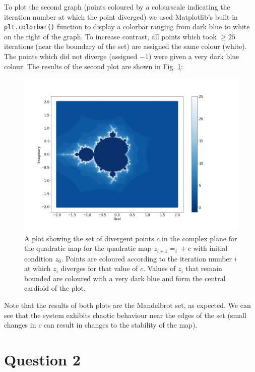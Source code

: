 \documentclass{article}
\begin{document}
To plot the second graph (points coloured by a colourscale indicating the iteration number at which the point diverged) we used Matplotlib's built-in \texttt{plt.colorbar()} function to display a colorbar ranging from dark blue to white on the right of the graph. To increase contrast, all points which took $\geq 25$ iterations (near the boundary of the set) are assigned the same colour (white). The points which did not diverge (assigned $-1$) were given a very dark blue colour. The results of the second plot are shown in Fig. \ref{fig:quad_map_scale}:
\begin{figure}
    \hspace{-15mm}
    \includegraphics[scale=0.6]{quad_map_colouring_scale.png}
    \caption{A plot showing the set of divergent points $c$ in the complex plane for the quadratic map for the quadratic map $z_{i + 1} = _i + c$ with initial condition $z_0$. Points are coloured according to the iteration number $i$ at which $z_i$ diverges for that value of $c$. Values of $z_i$ that remain bounded are coloured with a very dark blue and form the central cardioid of the plot.}
    \label{fig:quad_map_scale}
\end{figure}
\smallbreak
Note that the results of both plots are the Mandelbrot set, as expected. We can see that the system exhibits chaotic behaviour near the edges of the set (small changes in $c$ can result in changes to the stability of the map).

\newpage
\section*{Question 2}
\end{document}
